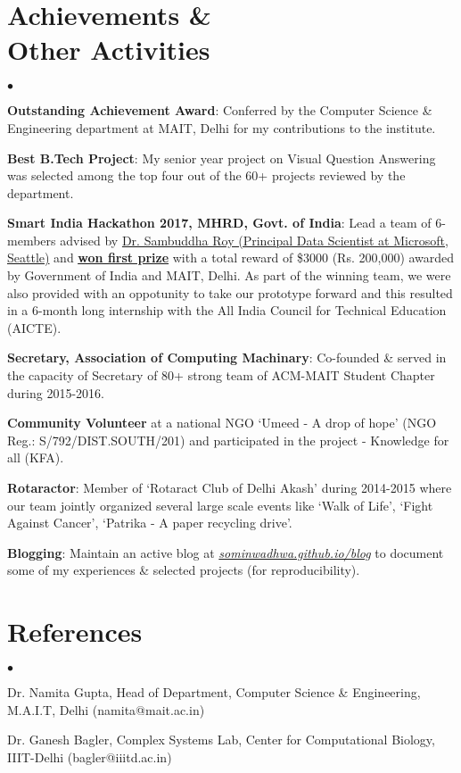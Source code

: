 \documentclass[margin,line]{res}
\newenvironment{list2}{
  \begin{list}{$\bullet$}{%
      \setlength{\itemsep}{0in}
      \setlength{\parsep}{0in} \setlength{\parskip}{0in}
      \setlength{\topsep}{0in} \setlength{\partopsep}{0in}
      \setlength{\leftmargin}{0.2in}}}{\end{list}}
\begin{document}
\begin{resume}
\section{\sc Achievements \& \\ Other Activities}
\begin{list2}
\item {\bf Outstanding Achievement Award}: Conferred by the Computer Science \& Engineering department at MAIT, Delhi for my contributions to the institute.
\item {\bf Best B.Tech Project}: My senior year project on Visual Question Answering was selected among the top four out of the 60+ projects reviewed by the department.
\item {\bf Smart India Hackathon 2017, MHRD, Govt. of India}: Lead a team of 6-members advised by {\href{https://www.linkedin.com/in/sambuddharoy/}{Dr. Sambuddha Roy (Principal Data Scientist at Microsoft, Seattle)}} and {\href{https://www.linkedin.com/feed/update/urn:li:activity:6255398180318470144}{\bf {\underline{won first prize}}}} with a total reward of \$3000 (Rs. 200,000) awarded by Government of India and MAIT, Delhi. As part of the winning team, we were also provided with an oppotunity to take our prototype forward and this resulted in a 6-month long internship with the All India Council for Technical Education (AICTE).
\item {\bf Secretary, Association of Computing Machinary}: Co-founded \& served in the capacity of Secretary of 80+ strong team of ACM-MAIT Student Chapter during 2015-2016.
\item {\bf Community Volunteer} at a national NGO `Umeed - A drop of hope' (NGO Reg.: S/792/DIST.SOUTH/201) and participated in the project - Knowledge for all (KFA).
\item {\bf Rotaractor}: Member of `Rotaract Club of Delhi Akash' during 2014-2015 where our team jointly organized several large scale events like `Walk of Life', `Fight Against Cancer', `Patrika - A paper recycling drive'. 
\item {\bf Blogging}: Maintain an active blog at \textit{{\href{https://sominwadhwa.github.io/blog/}{sominwadhwa.github.io/blog}}} to document some of my experiences \& selected projects (for reproducibility).
\end{list2}

\section{\sc References}
\begin{list2}
\item Dr. Namita Gupta, Head of Department, Computer Science \& Engineering, M.A.I.T, Delhi (namita@mait.ac.in)
\item Dr. Ganesh Bagler, Complex Systems Lab, Center for Computational Biology, IIIT-Delhi (bagler@iiitd.ac.in)
\end{list2}

\end{resume}
\end{document}
